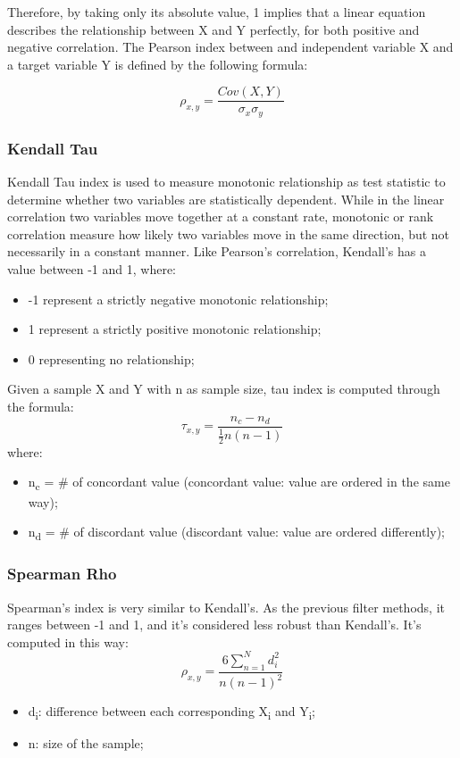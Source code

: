 Therefore, by taking only its absolute value, 1 implies that a linear equation describes the relationship between X and Y perfectly, for both positive and negative correlation. \newline
The Pearson index between and independent variable X and a target variable Y is defined by the following formula:

\begin{equation}
  \rho_{x,y} = \frac{Cov(X,Y)}{\sigma_x\sigma_y}
\end{equation}

\subsubsection{Kendall Tau}
Kendall Tau index is used to measure monotonic relationship as test statistic to determine whether two variables are statistically dependent. \newline
While in the linear correlation two variables move together at a constant rate, monotonic or rank correlation measure how likely two variables move in the same direction, but not necessarily in a constant manner. \newline
Like Pearson’s correlation, Kendall’s has a value between -1 and 1, where:

\begin{itemize}
\item -1 represent a strictly negative monotonic relationship;
\item 1 represent a strictly positive monotonic relationship;
\item 0 representing no relationship;
\end{itemize}
Given a sample X and Y with n as sample size, tau index is computed through the formula:
\begin{equation}
  \tau_{x,y} = \frac{n_c-n_d}{\frac{1}{2}n(n-1)}
\end{equation}
where:
\begin{itemize}
\item n\textsubscript{c} = \# of concordant value (concordant value: value are ordered in the same way);
\item n\textsubscript{d} = \# of discordant value (discordant value: value are ordered differently);
\end{itemize}
\subsubsection{Spearman Rho}
Spearman’s index is very similar to Kendall’s. As the previous filter methods, it ranges between -1 and 1, and it's considered less robust than Kendall's.
It's computed in this way:
\begin{equation}
\rho_{x,y} = \frac{6\sum_{n=1}^{N} d_i^2}{n(n-1)^2}
\end{equation}
\begin{itemize}
\item d\textsubscript{i}: difference between each corresponding X\textsubscript{i} and Y\textsubscript{i};
\item n: size of the sample;
\end{itemize}

